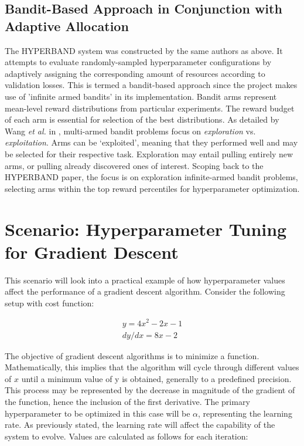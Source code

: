 \subsection{Bandit-Based Approach in Conjunction with Adaptive Allocation}
 The HYPERBAND system was constructed by the same authors as above. It attempts to evaluate randomly-sampled hyperparameter configurations by adaptively assigning the corresponding amount of resources according to validation losses. This is termed a bandit-based approach since the project makes use of 'infinite armed bandits' in its implementation. Bandit arms represent mean-level reward distributions from particular experiments. The reward budget of each arm is essential for selection of the best distributions.  As detailed by Wang \textit{et al.} in \cite{Wang2009}, multi-armed bandit problems focus on \textit{exploration} vs. \textit{exploitation}. Arms can be `exploited', meaning that they performed well and may be selected for their respective task. Exploration may entail pulling entirely new arms, or pulling already discovered ones of interest. Scoping back to the HYPERBAND paper, the focus is on exploration infinite-armed bandit problems, selecting arms within the top reward percentiles for hyperparameter optimization.


\section{Scenario: Hyperparameter Tuning for Gradient Descent}
This scenario will look into a practical example of how hyperparameter values affect the performance of a gradient descent algorithm. Consider the following setup with cost function:

\begin{eqnarray}
y = 4x^{2} - 2x - 1 \\
dy/{dx} = 8x-2
\end{eqnarray}

\noindent The objective of gradient descent algorithms is to minimize a function. Mathematically, this implies that the algorithm will cycle through different values of $x$ until a minimum value of y is obtained, generally to a predefined precision. This process may be represented by the decrease in magnitude of the gradient of the function, hence the inclusion of the first derivative. The primary hyperparameter to be optimized in this case will be $\alpha$, representing the learning rate. As previously stated, the learning rate will affect the capability of the system to evolve. Values are calculated as follows for each iteration:

